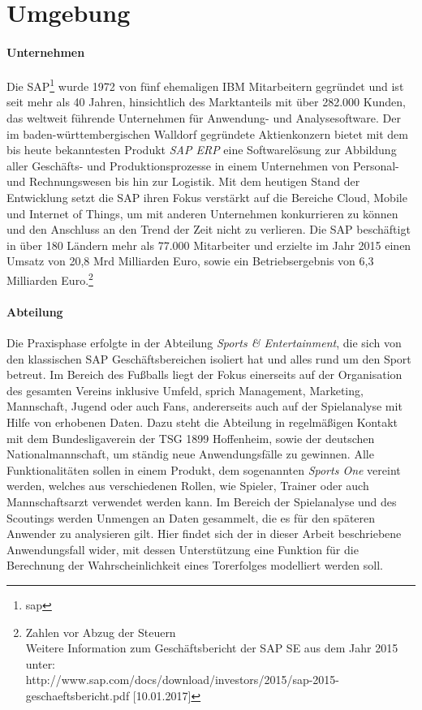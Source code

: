 \section{Umgebung}
\paragraph{Unternehmen}
Die SAP\footnote{\gls{sap}} wurde 1972 von fünf ehemaligen IBM Mitarbeitern gegründet und ist seit mehr als 40 Jahren, hinsichtlich des Marktanteils mit über 282.000 Kunden, das weltweit führende Unternehmen für Anwendung- und Analysesoftware. Der im baden-württembergischen Walldorf gegründete Aktienkonzern bietet mit dem bis heute bekanntesten Produkt \textit{SAP ERP} eine Softwarelösung zur Abbildung aller Geschäfts- und Produktionsprozesse in einem Unternehmen von Personal- und Rechnungswesen bis hin zur Logistik. Mit dem heutigen Stand der Entwicklung setzt die SAP ihren Fokus verstärkt auf die Bereiche Cloud, Mobile und Internet of Things, um mit anderen Unternehmen konkurrieren zu können und den Anschluss an den Trend der Zeit nicht zu verlieren. Die SAP beschäftigt in über 180 Ländern mehr als 77.000 Mitarbeiter und erzielte im Jahr 2015 einen Umsatz von 20,8 Mrd Milliarden Euro, sowie ein Betriebsergebnis von 6,3 Milliarden Euro.\footnote{Zahlen vor Abzug der Steuern\\ Weitere Information zum Geschäftsbericht der SAP SE aus dem Jahr 2015 unter: \\ http://www.sap.com/docs/download/investors/2015/sap-2015-geschaeftsbericht.pdf [10.01.2017]}

\paragraph{Abteilung}
Die Praxisphase erfolgte in der Abteilung \textit{Sports \& Entertainment}, die sich von den klassischen SAP Geschäftsbereichen isoliert hat und alles rund um den Sport betreut. Im Bereich des Fußballs liegt der Fokus einerseits auf der Organisation des gesamten Vereins inklusive Umfeld, sprich Management, Marketing, Mannschaft, Jugend oder auch Fans, andererseits auch auf der Spielanalyse mit Hilfe von erhobenen Daten. Dazu steht die Abteilung in regelmäßigen Kontakt mit dem Bundesligaverein der TSG 1899 Hoffenheim, sowie der deutschen Nationalmannschaft, um ständig neue Anwendungsfälle zu gewinnen. Alle Funktionalitäten sollen in einem Produkt, dem sogenannten \textit{Sports One} vereint werden, welches aus verschiedenen Rollen, wie Spieler, Trainer oder auch Mannschaftsarzt verwendet werden kann. Im Bereich der Spielanalyse und des Scoutings werden Unmengen an Daten gesammelt, die es für den späteren Anwender zu analysieren gilt. Hier findet sich der in dieser Arbeit beschriebene Anwendungsfall wider, mit dessen Unterstützung eine Funktion für die Berechnung der Wahrscheinlichkeit eines Torerfolges modelliert werden soll.